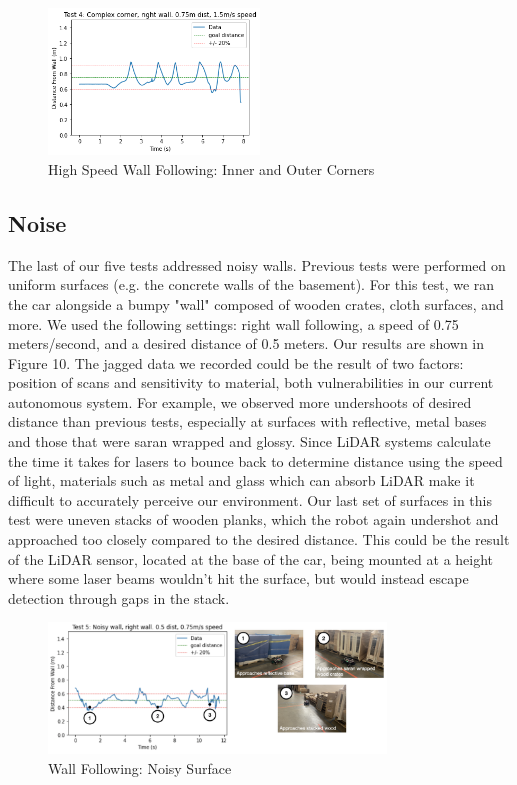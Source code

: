 \documentclass{article}
\begin{document}
\begin{figure}[H]
\begin{center}
\includegraphics[width=0.5\textwidth]{plot4.png} %
\caption{High Speed Wall Following: Inner and Outer Corners}
\end{center}
\label{workflow}
\end{figure}

\subsection{Noise}
The last of our five tests addressed noisy walls. Previous tests were performed on uniform surfaces (e.g. the concrete walls of the basement). For this test, we ran the car alongside a bumpy "wall" composed of wooden crates, cloth surfaces, and more. We used the following settings: right wall following, a speed of 0.75 meters/second, and a desired distance of 0.5 meters. Our results are shown in Figure 10. The jagged data we recorded could be the result of two factors: position of scans and sensitivity to material, both vulnerabilities in our current autonomous system. For example, we observed more undershoots of desired distance than previous tests, especially at surfaces with reflective, metal bases and those that were saran wrapped and glossy. Since LiDAR systems calculate the time it takes for lasers to bounce back to determine distance using the speed of light, materials such as metal and glass which can absorb LiDAR make it difficult to accurately perceive our environment. Our last set of surfaces in this test were  uneven stacks of wooden planks, which the robot again undershot and approached too closely compared to the desired distance. This could be the result of the LiDAR sensor, located at the base of the car, being mounted at a height where some laser beams wouldn't hit the surface, but would instead escape detection through gaps in the stack.

\begin{figure}[H]
\begin{center}
\includegraphics[width=0.8\textwidth]{noisy_figure.png} %
\caption{Wall Following: Noisy Surface}
\end{center}
\label{workflow}
\end{figure}
\end{document}
